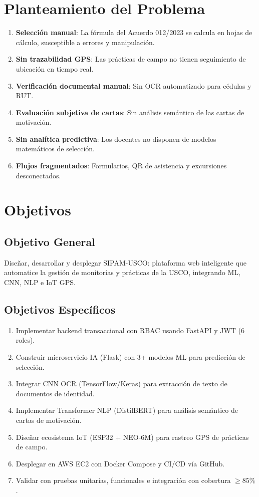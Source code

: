 \documentclass[12pt,a4paper,twoside]{report}
\begin{document}
\section{Planteamiento del Problema}
\begin{enumerate}[label=\textbf{P\arabic*.},leftmargin=*]
\item \textbf{Selección manual}: La fórmula del Acuerdo 012/2023 se calcula en hojas de cálculo, susceptible a errores y manipulación.
\item \textbf{Sin trazabilidad GPS}: Las prácticas de campo no tienen seguimiento de ubicación en tiempo real.
\item \textbf{Verificación documental manual}: Sin OCR automatizado para cédulas y RUT.
\item \textbf{Evaluación subjetiva de cartas}: Sin análisis semántico de las cartas de motivación.
\item \textbf{Sin analítica predictiva}: Los docentes no disponen de modelos matemáticos de selección.
\item \textbf{Flujos fragmentados}: Formularios, QR de asistencia y excursiones desconectados.
\end{enumerate}

\section{Objetivos}
\subsection{Objetivo General}
Diseñar, desarrollar y desplegar SIPAM-USCO: plataforma web inteligente que automatice la gestión de
monitorías y prácticas de la USCO, integrando ML, CNN, NLP e IoT GPS.

\subsection{Objetivos Específicos}
\begin{enumerate}[label=\textbf{OE\arabic*.},leftmargin=*]
\item Implementar backend transaccional con RBAC usando FastAPI y JWT (6 roles).
\item Construir microservicio IA (Flask) con 3+ modelos ML para predicción de selección.
\item Integrar CNN OCR (TensorFlow/Keras) para extracción de texto de documentos de identidad.
\item Implementar Transformer NLP (DistilBERT) para análisis semántico de cartas de motivación.
\item Diseñar ecosistema IoT (ESP32 + NEO-6M) para rastreo GPS de prácticas de campo.
\item Desplegar en AWS EC2 con Docker Compose y CI/CD vía GitHub.
\item Validar con pruebas unitarias, funcionales e integración con cobertura $\geq 85\%$.
\end{enumerate}
\end{document}
